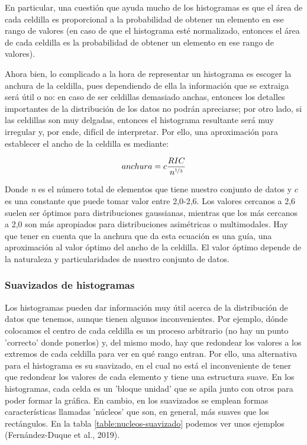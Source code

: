 \documentclass[12pt]{article}
\begin{document}
En particular, una cuestión que ayuda mucho de los histogramas es que el área de cada celdilla es proporcional a la probabilidad de obtener un elemento en ese rango de valores (en caso de que el histograma esté normalizado, entonces el área de cada celdilla es la probabilidad de obtener un elemento en ese rango de valores).

Ahora bien, lo complicado a la hora de representar un histograma es escoger la anchura de la celdilla, pues dependiendo de ella la información que se extraiga será útil o no: en caso de ser celdillas demasiado anchas, entonces los detalles importantes de la distribución de los datos no podrán apreciarse; por otro lado, si las celdillas son muy delgadas, entonces el histograma resultante será muy irregular y, por ende, difícil de interpretar. Por ello, una aproximación para establecer el ancho de la celdilla es mediante:

\begin{equation}
anchura = c \frac{RIC}{n^{\nicefrac{1}{3}}}
\label{eq:bin_width}
\end{equation}

Donde \textit{n} es el número total de elementos que tiene nuestro conjunto de datos y $c$ es una constante que puede tomar valor entre 2,0-2,6. Los valores cercanos a 2,6 suelen ser óptimos para distribuciones gaussianas, mientras que los más cercanos a 2,0 son más apropiados para distribuciones asimétricas o multimodales. Hay que tener en cuenta que la anchura que da esta ecuación es una guía, una aproximación al valor óptimo del ancho de la celdilla. El valor óptimo depende de la naturaleza y particularidades de nuestro conjunto de datos.

\subsubsection{Suavizados de histogramas}

Los histogramas pueden dar información muy útil acerca de la distribución de datos que tenemos, aunque tienen algunos inconvenientes. Por ejemplo, dónde colocamos el centro de cada celdilla es un proceso arbitrario (no hay un punto 'correcto' donde ponerlos) y, del mismo modo, hay que redondear los valores a los extremos de cada celdilla para ver en qué rango entran. Por ello, una alternativa para el histograma es su suavizado, en el cual no está el inconveniente de tener que redondear los valores de cada elemento y tiene una estructura suave. En los histogramas, cada celda es un 'bloque unidad' que se apila junto con otros para poder formar la gráfica. En cambio, en los suavizados se emplean formas características llamadas 'núcleos' que son, en general, más suaves que los rectángulos. En la tabla \ref{table:nucleos-suavizado} podemos ver unos ejemplos (Fernández-Duque et al., 2019).
\end{document}

